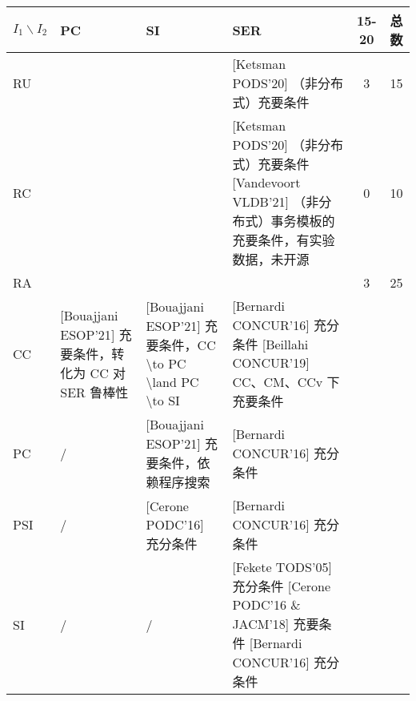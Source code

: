 \begin{table}[]
\begin{tabular}{|l|l|l|l|l|l|}
\hline
$I_1 \backslash I_2$ & PC                                            & SI                                                                                                  & SER                                                                                          & \multicolumn{1}{c|}{15-20} & \multicolumn{1}{c|}{总数} \\ \hline
RU                      &                                               &                                                                                                     & {[}Ketsman PODS'20{]} （非分布式）充要条件                                                             & \multicolumn{1}{c|}{3}     & \multicolumn{1}{c|}{15} \\ \hline
RC                      &                                               &                                                                                                     & {[}Ketsman PODS'20{]} （非分布式）充要条件 {[}Vandevoort VLDB'21{]} （非分布式）事务模板的充要条件，有实验数据，未开源          & \multicolumn{1}{c|}{0}     & \multicolumn{1}{c|}{10} \\ \hline
RA                      &                                               &                                                                                                     &                                                                                              & \multicolumn{1}{c|}{3}     & \multicolumn{1}{c|}{25} \\ \hline
CC                      & {[}Bouajjani ESOP'21{]} 充要条件，转化为 CC 对 SER 鲁棒性 & {[}Bouajjani ESOP'21{]} 充要条件，CC \textbackslash{}to PC \textbackslash{}land PC \textbackslash{}to SI & {[}Bernardi CONCUR'16{]} 充分条件 {[}Beillahi CONCUR'19{]} CC、CM、CCv 下充要条件                       &                            &                         \\ \hline
PC                      & /                                             & {[}Bouajjani ESOP'21{]} 充要条件，依赖程序搜索                                                                 & {[}Bernardi CONCUR'16{]} 充分条件                                                                &                            &                         \\ \hline
PSI                     & /                                             & {[}Cerone PODC'16{]} 充分条件                                                                           & {[}Bernardi CONCUR'16{]} 充分条件                                                                &                            &                         \\ \hline
SI                      & /                                             & /                                                                                                   & {[}Fekete TODS'05{]} 充分条件 {[}Cerone PODC'16 \& JACM'18{]} 充要条件 {[}Bernardi CONCUR'16{]} 充分条件 &                            &                         \\ \hline
\end{tabular}
\end{table}